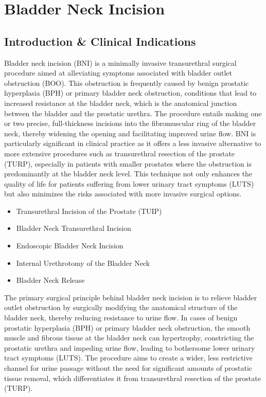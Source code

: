 \chapter{Bladder Neck Incision}

\section*{Introduction \& Clinical Indications}
Bladder neck incision (BNI) is a minimally invasive transurethral surgical procedure aimed at alleviating symptoms associated with bladder outlet obstruction (BOO). This obstruction is frequently caused by benign prostatic hyperplasia (BPH) or primary bladder neck obstruction, conditions that lead to increased resistance at the bladder neck, which is the anatomical junction between the bladder and the prostatic urethra. The procedure entails making one or two precise, full-thickness incisions into the fibromuscular ring of the bladder neck, thereby widening the opening and facilitating improved urine flow. BNI is particularly significant in clinical practice as it offers a less invasive alternative to more extensive procedures such as transurethral resection of the prostate (TURP), especially in patients with smaller prostates where the obstruction is predominantly at the bladder neck level. This technique not only enhances the quality of life for patients suffering from lower urinary tract symptoms (LUTS) but also minimizes the risks associated with more invasive surgical options.

\begin{itemize}
  \item Transurethral Incision of the Prostate (TUIP)
  \item Bladder Neck Transurethral Incision
  \item Endoscopic Bladder Neck Incision
  \item Internal Urethrotomy of the Bladder Neck
  \item Bladder Neck Release
\end{itemize}

The primary surgical principle behind bladder neck incision is to relieve bladder outlet obstruction by surgically modifying the anatomical structure of the bladder neck, thereby reducing resistance to urine flow. In cases of benign prostatic hyperplasia (BPH) or primary bladder neck obstruction, the smooth muscle and fibrous tissue at the bladder neck can hypertrophy, constricting the prostatic urethra and impeding urine flow, leading to bothersome lower urinary tract symptoms (LUTS). The procedure aims to create a wider, less restrictive channel for urine passage without the need for significant amounts of prostatic tissue removal, which differentiates it from transurethral resection of the prostate (TURP).

